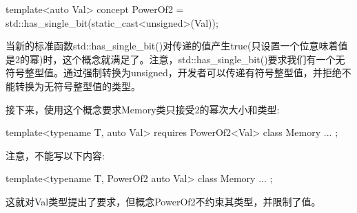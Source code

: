 \begin{cpp}
template<auto Val>
concept PowerOf2 = std::has_single_bit(static_cast<unsigned>(Val));
\end{cpp}

当新的标准函数std::has\_single\_bit()对传递的值产生true(只设置一个位意味着值是2的幂)时，这个概念就满足了。注意，std::has\_single\_bit()要求我们有一个无符号整型值。通过强制转换为unsigned，开发者可以传递有符号整型值，并拒绝不能转换为无符号整型值的类型。

接下来，使用这个概念要求Memory类只接受2的幂次大小和类型:

\begin{cpp}
template<typename T, auto Val>
requires PowerOf2<Val>
class Memory {
	...
};
\end{cpp}

注意，不能写以下内容:


\begin{cpp}
template<typename T, PowerOf2 auto Val>
class Memory {
	...
};
\end{cpp}

这就对Val类型提出了要求，但概念PowerOf2不约束其类型，并限制了值。








